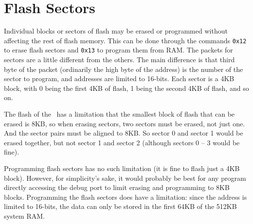 \section*{Flash Sectors}
Individual blocks or sectors of flash may be erased or programmed without affecting the rest of flash memory. This can be done through the commands \verb+0x12+ to erase flash sectors and \verb+0x13+ to program them from RAM. The packets for sectors are a little different from the others. The main difference is that third byte of the packet (ordinarily the high byte of the address) is the number of the sector to program, and addresses are limited to 16-bits. Each sector is a 4KB block, with 0 being the first 4KB of flash, 1 being the second 4KB of flash, and so on.

The flash of the \jr\ has a limitation that the smallest block of flash that can be erased is 8KB, so when erasing sectors, two sectors must be erased, not just one. And the sector pairs must be aligned to 8KB. So sector 0 and sector 1 would be erased together, but not sector 1 and sector 2 (although sectors 0 -- 3 would be fine).

Programming flash sectors has no such limitation (it is fine to flash just a 4KB block). However, for simplicity's sake, it would probably be best for any program directly accessing the debug port to limit erasing and programming to 8KB blocks. Programming the flash sectors does have a limitation: since the address is limited to 16-bits, the data can only be stored in the first 64KB of the 512KB system RAM.
